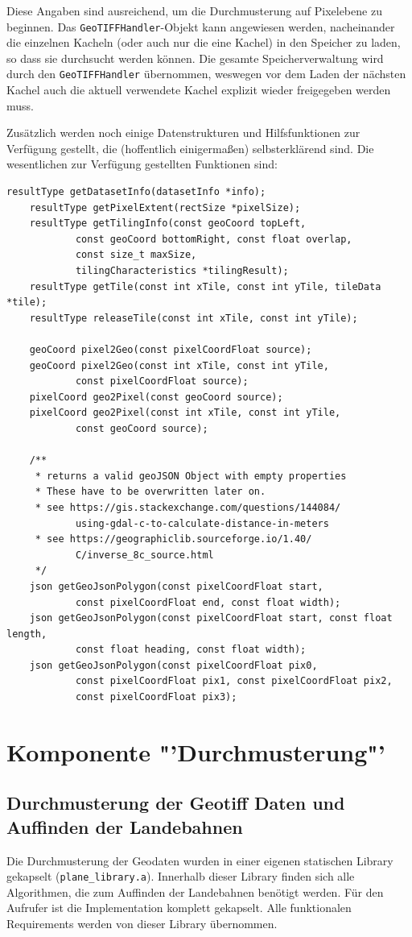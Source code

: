\documentclass[10pt,a4paper]{report}
\begin{document}
Diese Angaben sind ausreichend, um die Durchmusterung auf Pixelebene zu beginnen. Das \texttt{GeoTIFFHandler}-Objekt kann angewiesen werden, nacheinander die einzelnen Kacheln (oder auch nur die eine Kachel) in den Speicher zu laden, so dass sie durchsucht werden können. Die gesamte Speicherverwaltung wird durch den \texttt{GeoTIFFHandler} übernommen, weswegen vor dem Laden der nächsten Kachel auch die aktuell verwendete Kachel explizit wieder freigegeben werden muss.

Zusätzlich werden noch einige Datenstrukturen und Hilfsfunktionen zur Verfügung gestellt, die (hoffentlich einigermaßen) selbsterklärend sind.
Die wesentlichen zur Verfügung gestellten Funktionen sind:
\begin{lstlisting}[language=myC]
	resultType getDatasetInfo(datasetInfo *info);
	resultType getPixelExtent(rectSize *pixelSize);
	resultType getTilingInfo(const geoCoord topLeft, 
			const geoCoord bottomRight, const float overlap, 
			const size_t maxSize, 
			tilingCharacteristics *tilingResult);
	resultType getTile(const int xTile, const int yTile, tileData *tile);
	resultType releaseTile(const int xTile, const int yTile);

	geoCoord pixel2Geo(const pixelCoordFloat source);
	geoCoord pixel2Geo(const int xTile, const int yTile, 
			const pixelCoordFloat source);
	pixelCoord geo2Pixel(const geoCoord source);
	pixelCoord geo2Pixel(const int xTile, const int yTile, 
			const geoCoord source);

	/**
	 * returns a valid geoJSON Object with empty properties
	 * These have to be overwritten later on.
	 * see https://gis.stackexchange.com/questions/144084/
	 		using-gdal-c-to-calculate-distance-in-meters
	 * see https://geographiclib.sourceforge.io/1.40/
	 		C/inverse_8c_source.html
	 */
	json getGeoJsonPolygon(const pixelCoordFloat start, 
			const pixelCoordFloat end, const float width);
	json getGeoJsonPolygon(const pixelCoordFloat start, const float length, 
			const float heading, const float width);
	json getGeoJsonPolygon(const pixelCoordFloat pix0, 
			const pixelCoordFloat pix1, const pixelCoordFloat pix2, 
			const pixelCoordFloat pix3);
\end{lstlisting}

\chapter{Komponente "'Durchmusterung"'}
\section{Durchmusterung der Geotiff Daten und Auffinden der Landebahnen}
Die Durchmusterung der Geodaten wurden in einer eigenen statischen Library gekapselt (\texttt{plane\_library.a}). Innerhalb dieser Library finden sich alle Algorithmen, die zum Auffinden der Landebahnen benötigt werden. Für den Aufrufer ist die Implementation komplett gekapselt. Alle funktionalen Requirements werden von dieser Library übernommen.
\end{document}
